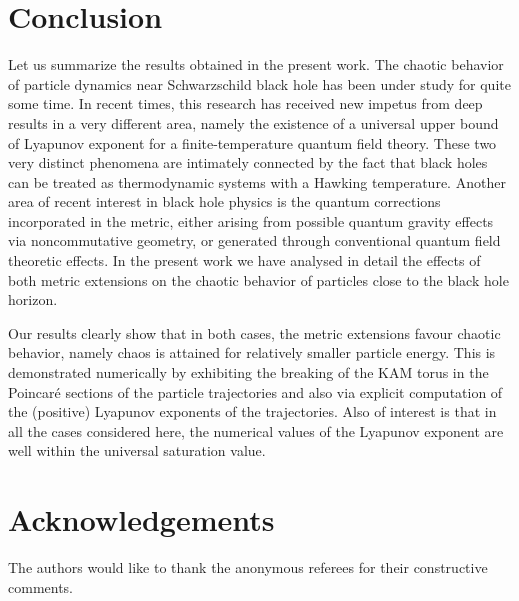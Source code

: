 \documentclass[aps,prd,showpacs,nofootinbib,floats,floatfix,preprintnumbers,groupedaddress,twocolumn]{revtex4-1}
\begin{document}
\section{Conclusion}
\par\noindent
Let us summarize the results obtained in the present work. The chaotic behavior of particle dynamics near Schwarzschild black hole has been under study for quite some time. In recent times, this research has received new impetus from deep results in a very different area, namely the existence of a universal upper bound of Lyapunov exponent for a finite-temperature quantum field theory. These two very distinct phenomena are intimately connected by the fact that black holes can be treated as thermodynamic systems with a Hawking temperature. Another area of recent interest in black hole physics is the quantum corrections incorporated in the metric, either arising from possible quantum gravity effects via noncommutative geometry, or generated through conventional quantum field theoretic effects. In the present work we have analysed in detail the effects of both metric extensions on the chaotic behavior of particles close to the black hole horizon.
%
%
\par
 Our results clearly show that in both cases, the metric extensions favour chaotic behavior, namely chaos is attained for relatively smaller particle energy. This is demonstrated numerically by exhibiting the breaking of the KAM torus in the Poincar\'e sections of the particle trajectories and also via explicit computation of the (positive) Lyapunov exponents of the trajectories. Also of interest is  that in all the cases considered here, the numerical values of the Lyapunov exponent are well within the universal saturation value.
% 
%
%
%
\section{Acknowledgements}
%
%
\par\noindent
The authors would like to thank the anonymous referees for their constructive comments.\\
%
%
%
%

%
%
%
%
\appendix
\end{document}
